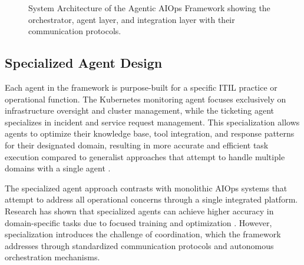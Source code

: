 \documentclass{article}
\begin{document}
\begin{figure}[htbp]
  \caption{System Architecture of the Agentic AIOps Framework showing the orchestrator, agent layer, and integration layer with their communication protocols.}
  \label{fig:architecture}
\end{figure}

\subsection{Specialized Agent Design}

Each agent in the framework is purpose-built for a specific ITIL practice or operational function. The Kubernetes monitoring agent focuses exclusively on infrastructure oversight and cluster management, while the ticketing agent specializes in incident and service request management. This specialization allows agents to optimize their knowledge base, tool integration, and response patterns for their designated domain, resulting in more accurate and efficient task execution compared to generalist approaches that attempt to handle multiple domains with a single agent \cite{chen2024}.

The specialized agent approach contrasts with monolithic AIOps systems that attempt to address all operational concerns through a single integrated platform. Research has shown that specialized agents can achieve higher accuracy in domain-specific tasks due to focused training and optimization \cite{kumar2023}. However, specialization introduces the challenge of coordination, which the framework addresses through standardized communication protocols and autonomous orchestration mechanisms.
\end{document}
